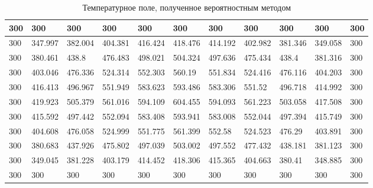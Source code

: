 \documentclass[12pt, a4paper]{article}
\begin{document}
\begin{table}[ht]
	\small
	\caption{Температурное поле, полученное вероятностным методом}
	\label{tbl:probability}
	\begin{tabular}{|l|l|l|l|l|l|l|l|l|l|l|}
		\hline
		300 & 300     & 300     & 300     & 300     & 300     & 300     & 300     & 300     & 300     & 300 \\ \hline
		300 & 347.997 & 382.004 & 404.381 & 416.424 & 418.476 & 414.192 & 402.982 & 381.346 & 349.058 & 300 \\ \hline
		300 & 380.461 & 438.8   & 476.483 & 498.021 & 504.324 & 497.636 & 475.434 & 438.4   & 381.316 & 300 \\ \hline
		300 & 403.046 & 476.336 & 524.314 & 552.303 & 560.19  & 551.834 & 524.416 & 476.116 & 404.203 & 300 \\ \hline
		300 & 416.413 & 496.967 & 551.949 & 583.623 & 593.486 & 583.306 & 551.52  & 496.718 & 414.992 & 300 \\ \hline
		300 & 419.923 & 505.379 & 561.016 & 594.109 & 604.455 & 594.093 & 561.223 & 503.058 & 417.508 & 300 \\ \hline
		300 & 415.592 & 497.442 & 552.094 & 583.408 & 593.941 & 583.008 & 552.044 & 497.394 & 415.749 & 300 \\ \hline
		300 & 404.608 & 476.058 & 524.999 & 551.775 & 561.399 & 552.58  & 524.523 & 476.29  & 403.891 & 300 \\ \hline
		300 & 380.683 & 437.926 & 475.802 & 497.039 & 503.002 & 497.552 & 477.432 & 438.181 & 381.123 & 300 \\ \hline
		300 & 349.045 & 381.228 & 403.179 & 414.452 & 418.306 & 415.365 & 404.663 & 380.41  & 348.885 & 300 \\ \hline
		300 & 300     & 300     & 300     & 300     & 300     & 300     & 300     & 300     & 300     & 300 \\ \hline
	\end{tabular}
\end{table}
\end{document}

